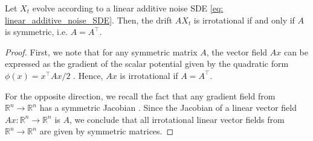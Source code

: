 \documentclass[twoside,11pt]{article}
\newcommand{\R} {\mathbb R}
\newcommand{\indep}{\perp\!\!\!\!\perp}
\begin{document}
\begin{lemma}
\label{prop: irrotational_implies_symmetric}
Let $X_t$ evolve according to a linear additive noise SDE \eqref{eq: linear_additive_noise_SDE}. Then, the drift $AX_t$ is irrotational if and only if $A$ is symmetric, i.e. $A = A^\top$.
\end{lemma}
\begin{proof}
First, we note that for any symmetric matrix $A$, the vector field $Ax$ can be expressed as the gradient of the scalar potential given by the quadratic form $\phi(x) = x^\top A x/2$ \citep[(96)-(97)]{petersen2008matrix}. Hence, $Ax$ is irrotational if $A = A^\top$.

For the opposite direction, we recall the fact that any gradient field from $\R^n \to \R^n$ has a symmetric Jacobian \citep{williamson1974multivariable, campbell2014reduction}. Since the Jacobian of a linear vector field $Ax : \R^n \to \R^n$ is $A$, we conclude that all irrotational linear vector fields from $\R^n \to \R^n$ are given by symmetric matrices.
\end{proof}



\end{document}
